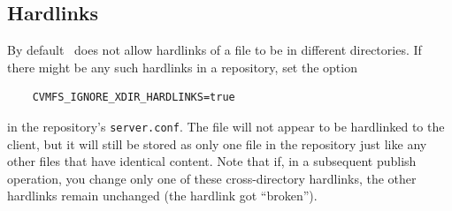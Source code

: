 \subsection{Hardlinks}
By default \cvmfs\ does not allow hardlinks of a file to be in different directories.
If there might be any such hardlinks in a repository, set the option
\begin{verbatim}
    CVMFS_IGNORE_XDIR_HARDLINKS=true
\end{verbatim}
in the repository's \texttt{server.conf}.
The file will not appear to be hardlinked to the client, but it will still be stored as only one file in the repository just like any other files that have identical content.
Note that if, in a subsequent publish operation, you change only one of these cross-directory hardlinks, the other hardlinks remain unchanged (the hardlink got ``broken'').

